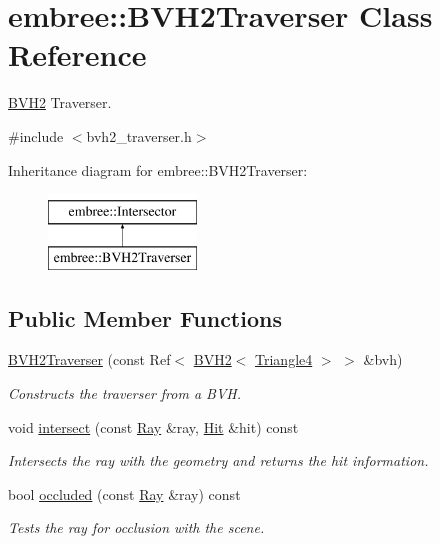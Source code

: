 \hypertarget{classembree_1_1_b_v_h2_traverser}{
\section{embree::BVH2Traverser Class Reference}
\label{classembree_1_1_b_v_h2_traverser}
}


\hyperlink{classembree_1_1_b_v_h2}{BVH2} Traverser.  




{\ttfamily \#include $<$bvh2\_\-traverser.h$>$}

Inheritance diagram for embree::BVH2Traverser:\begin{figure}[H]
\begin{center}
\leavevmode
\includegraphics[height=2.000000cm]{classembree_1_1_b_v_h2_traverser}
\end{center}
\end{figure}
\subsection*{Public Member Functions}
\begin{DoxyCompactItemize}
\item 
\hyperlink{classembree_1_1_b_v_h2_traverser_a56525e51ec4429392131e3b2c3d7608e}{BVH2Traverser} (const Ref$<$ \hyperlink{classembree_1_1_b_v_h2}{BVH2}$<$ \hyperlink{structembree_1_1_triangle4}{Triangle4} $>$ $>$ \&bvh)
\begin{DoxyCompactList}\small\item\em Constructs the traverser from a BVH. \item\end{DoxyCompactList}\item 
void \hyperlink{classembree_1_1_b_v_h2_traverser_aa3957f20e8dc2f86ca98d4f8671b503a}{intersect} (const \hyperlink{structembree_1_1_ray}{Ray} \&ray, \hyperlink{structembree_1_1_hit}{Hit} \&hit) const 
\begin{DoxyCompactList}\small\item\em Intersects the ray with the geometry and returns the hit information. \item\end{DoxyCompactList}\item 
bool \hyperlink{classembree_1_1_b_v_h2_traverser_a6602c3460d258d2dee9e91c622568548}{occluded} (const \hyperlink{structembree_1_1_ray}{Ray} \&ray) const 
\begin{DoxyCompactList}\small\item\em Tests the ray for occlusion with the scene. \item\end{DoxyCompactList}\end{DoxyCompactItemize}


